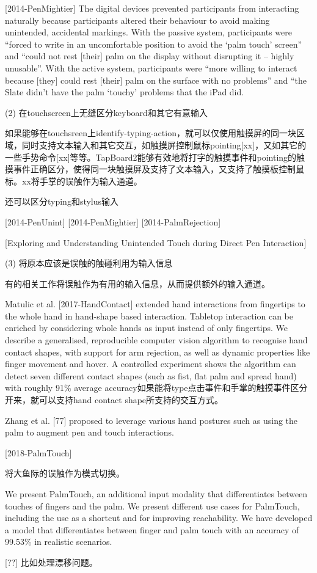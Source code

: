 [2014-PenMightier]
The digital devices prevented participants from interacting naturally because participants altered their behaviour to avoid making unintended, accidental markings. With the passive system, participants were “forced to write in an uncomfortable position to avoid the ‘palm touch’ screen” and “could not rest [their] palm on the display without disrupting it –
highly unusable”. With the active system, participants were “more willing to interact because [they] could rest [their] palm on the surface with no problems” and “the Slate didn’t have the palm ‘touchy’ problems that the iPad did.

(2) 在touchscreen上无缝区分keyboard和其它有意输入

如果能够在touchsreen上identify-typing-action，就可以仅使用触摸屏的同一块区域，同时支持文本输入和其它交互，如触摸屏控制鼠标pointing[xx]，又如其它的一些手势命令[xx]等等。TapBoard2能够有效地将打字的触摸事件和pointing的触摸事件正确区分，使得同一块触摸屏及支持了文本输入，又支持了触摸板控制鼠标。xx将手掌的误触作为输入通道。

还可以区分typing和stylus输入

[2014-PenUnint]
[2014-PenMightier]
[2014-PalmRejection]

[Exploring and Understanding Unintended Touch during Direct Pen Interaction]

(3) 将原本应该是误触的触碰利用为输入信息

有的相关工作将误触作为有用的输入信息，从而提供额外的输入通道。

Matulic et al. [2017-HandContact] extended hand interactions from fingertips to the whole hand in hand-shape based interaction. Tabletop interaction can be enriched by considering whole hands as input instead of only fingertips. We describe a
generalised, reproducible computer vision algorithm to recognise hand contact shapes, with support for arm rejection, as well as dynamic properties like finger movement
and hover. A controlled experiment shows the algorithm can detect seven different contact shapes (such as fist, flat palm and spread hand) with roughly 91\% average accuracy如果能将type点击事件和手掌的触摸事件区分开来，就可以支持hand contact shape所支持的交互方式。

Zhang et al. [77] proposed to leverage various hand postures such as using the palm to augment pen and touch interactions.

[2018-PalmTouch]

将大鱼际的误触作为模式切换。

We present PalmTouch, an additional input modality that differentiates between touches of fingers and the palm. We present different use cases for PalmTouch, including the
use as a shortcut and for improving reachability.  We have developed a model that differentiates between finger and palm touch with an accuracy of 99.53\% in realistic scenarios.

[??] 比如处理漂移问题。

